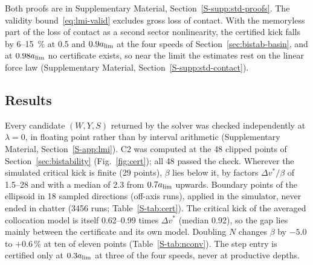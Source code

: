 Both proofs are in Supplementary Material, Section~\ref{S-supp:std-proofs}. The validity bound~\eqref{eq:lmi-valid} excludes gross loss of contact. With the memoryless part of the loss of contact as a second sector nonlinearity, the certified kick falls by 6--\SI{15}{\percent} at 0.5 and $0.9a_{\lim}$ at the four speeds of Section~\ref{sec:bistab-basin}, and at $0.98a_{\lim}$ no certificate exists, so near the limit the estimates rest on the linear force law (Supplementary Material, Section~\ref{S-supp:std-contact}).

\subsection{Results}\label{sec:cert-c2}

\label{sec:cert-check}Every candidate $(W,Y,S)$ returned by the solver was checked independently at $\lambda=0$, in floating point rather than by interval arithmetic (Supplementary Material, Section~\ref{S-app:lmi}). C2 was computed at the 48 clipped points of Section~\ref{sec:bistability} (Fig.~\ref{fig:cert}); all 48 passed the check. Wherever the simulated critical kick is finite (29 points), $\beta$ lies below it, by factors $\Delta v^*/\beta$ of 1.5--28 and with a median of 2.3 from $0.7a_{\lim}$ upwards. Boundary points of the ellipsoid in 18 sampled directions (off-axis runs), applied in the simulator, never ended in chatter (3456 runs; Table~\ref{S-tab:cert}). The critical kick of the averaged collocation model is itself 0.62--0.99 times $\Delta v^*$ (median 0.92), so the gap lies mainly between the certificate and its own model. Doubling $N$ changes $\beta$ by $-5.0$ to $+0.6$\,\% at ten of eleven points (Table~\ref{S-tab:nconv}). The step entry is certified only at $0.3a_{\lim}$ at three of the four speeds, never at productive depths.

